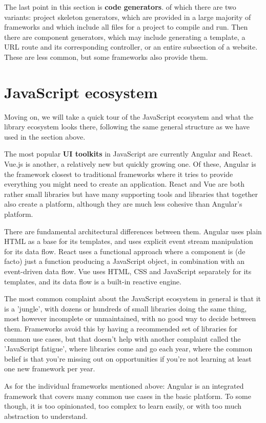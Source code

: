 \documentclass[english,odsaz]{fitthesis}
\begin{document}
The last point in this section is \textbf{code generators}. of which there are two
variants: project skeleton generators, which are provided in a large majority of
frameworks and which include all files for a project to compile and run. Then
there are component generators, which may include generating a template, a URL
route and its corresponding controller, or an entire subsection of a
website. These are less common, but some frameworks also provide them.

\section{JavaScript ecosystem}
\label{sec:orga57030c}
Moving on, we will take a quick tour of the JavaScript ecosystem and what the
library ecosystem looks there, following the same general structure as we have
used in the section above.

The most popular \textbf{UI toolkits} in JavaScript are currently Angular and
React. Vue.js is another, a relatively new but quickly growing one. Of these,
Angular is the framework closest to traditional frameworks where it tries to
provide everything you might need to create an application. React and Vue are
both rather small libraries but have many supporting tools and libraries that
together also create a platform, although they are much less cohesive than Angular's
platform.

There are fundamental architectural differences between them. Angular uses plain
HTML as a base for its templates, and uses explicit event stream manipulation
for its data flow. React uses a functional approach where a component is (de
facto) just a function producing a JavaScript object, in combination with an
event-driven data flow. Vue uses HTML, CSS and JavaScript separately for its
templates, and its data flow is a built-in reactive engine.

The most common complaint about the JavaScript ecosystem in general is that it
is a 'jungle', with dozens or hundreds of small libraries doing the same thing,
most however incomplete or unmaintained, with no good way to decide between
them. Frameworks avoid this by having a recommended set of libraries for common
use cases, but that doesn't help with another complaint called the 'JavaScript
fatigue', where libraries come and go each year, where the common belief is that
you're missing out on opportunities if you're not learning at least one new
framework per year.

As for the individual frameworks mentioned above: Angular is an integrated
framework that covers many common use cases in the basic platform. To some
though, it is too opinionated, too complex to learn easily, or with too much
abstraction to understand.
\end{document}
